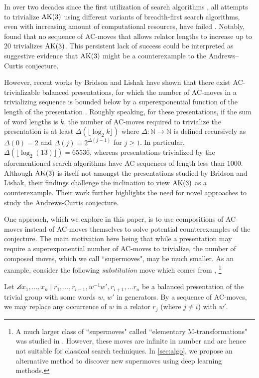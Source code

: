 In over two decades since the first utilization of search algorithms \cite{genetic, bfs-ac}, all attempts to trivialize $\text{AK}(3)$ using different variants of breadth-first search algorithms, even with increasing amount of computational resources, have failed \cite{Bowman-McCaul, krawiec2016distance, Panteleev-Ushakov}.
Notably, \cite{Panteleev-Ushakov} found that no sequence of AC-moves that allows relator lengths to increase up to 20 trivializes $\text{AK}(3)$.
This persistent lack of success could be interpreted as suggestive evidence that $\text{AK}(3)$ might be a counterexample to the Andrews--Curtis conjecture.

However, recent works by Bridson and Lishak have shown that there exist AC-trivializable balanced presentations, for which the number of AC-moves in a trivializing sequence is bounded below by a superexponential function of the length of the presentation \cite{Bridson, Lishak}.
Roughly speaking, for these presentations, if the sum of word lengths is $k$, the number of AC-moves required to trivialize the presentation is at least $\Delta (\lfloor \log_2 k \rfloor)$ where $\Delta \colon \mathbb{N} \to \mathbb{N}$ is defined recursively as $\Delta(0) = 2$ and $\Delta (j) = 2^{\Delta(j-1)}$ for $j \geq 1$.
In particular, $\Delta (\lfloor \log_2 (13) \rfloor) = 65536$, whereas presentations trivialized by the aforementioned search algorithms have AC sequences of length less than $1000$.
Although $\text{AK}(3)$ is itself not amongst the presentations studied by Bridson and Lishak, their findings challenge the inclination to view $\text{AK}(3)$ as a counterexample. Their work further highlights the need for novel approaches to study the Andrews-Curtis conjecture.

One approach, which we explore in this paper, is to use compositions of AC-moves instead of AC-moves themselves to solve potential counterexamples of the conjecture. The main motivation here being that while a presentation may require a superexponential number of AC-moves to trivialize, the number of composed moves, which we call ``supermoves", may be much smaller. As an example, consider the following \emph{substitution} move which comes from \cite{BurnsI},
\footnote{A much larger class of ``supermoves" called ``elementary M-transformations" was studied in \cite{BurnsI}. However, these moves are infinite in number and are hence not suitable for classical search techniques. In \autoref{sec:algo}, we propose an alternative method to discover new supermoves using deep learning methods.}

\begin{definition}[Substitution]\label{def:ac-sub}
 Let $\angles{x_1, \dots, x_n \mid r_1, \dots, r_{i-1}, w^{-1}w', r_{i+1}, \dots  r_n}$ be a balanced presentation of the trivial group with some words $w$, $w'$ in generators. By a sequence of AC-moves, we may replace any occurrence of $w$ in a relator $r_j$ (where $j \neq i$) with $w'$.
\end{definition}

